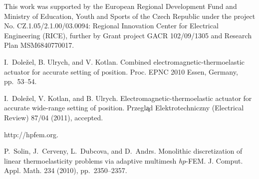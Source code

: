 This work was supported by the European Regional Development Fund and Ministry of Education, Youth and Sports of the Czech Republic under the project No. CZ.1.05/2.1.00/03.0094: Regional Innovation Center for Electrical Engineering (RICE), further by Grant project GACR 102/09/1305 and Research Plan MSM6840770017.


\begin{thebibliography}{10}
{\sc I.~Dole\v{z}el, B. Ulrych, and V. Kotlan}. {Combined electromagnetic-thermoelastic actuator for accurate setting of position}. Proc. EPNC 2010 Essen, Germany, pp.~53--54.

{\sc I.~Dole\v{z}el, V. Kotlan, and B. Ulrych}. {Electromagnetic-thermoelastic actuator for accurate wide-range setting of position}. Przegl\c{a}d Elektrotechniczny (Electrical Review) 87/04 (2011), accepted.

{http://hpfem.org}.

{\sc P.~Solin, J.~Cerveny, L.~Dubcova, and D.~Andrs}. {Monolithic discretization of linear thermoelasticity problems via adaptive multimesh \textit{hp}-FEM}. J. Comput. Appl. Math. 234 (2010), pp.~2350--2357.
\end{thebibliography}